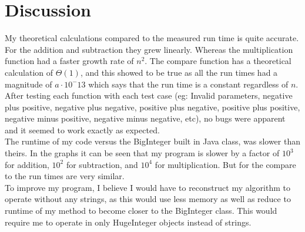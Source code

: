 \documentclass[12pt, letterpaper, titlepage, hidelinks]{article}
\begin{document}
\section{Discussion}
	My theoretical calculations compared to the measured run time is quite accurate. For the addition and subtraction they grew linearly. Whereas the multiplication function had a faster growth rate of $n^2$. The compare function has a theoretical calculation of $\Theta(1)$, and this showed to be true as all the run times had a magnitude of $a\cdot 10^-13$ which says that the run time is a constant regardless of $n$.\\
	After testing each function with each test case (eg: Invalid parameters, negative plus positive, negative plus negative, positive plus negative, positive plus positive, negative minus positive, negative minus negative, etc), no bugs were apparent and it seemed to work exactly as expected.\\
	The runtime of my code versus the BigInteger built in Java class, was slower than theirs. In the graphs it can be seen that my program is slower by a factor of $10^3$ for addition, $10^2$ for subtraction, and $10^4$ for multiplication. But for the compare to the run times are very similar.\\
	To improve my program, I believe I would have to reconstruct my algorithm to operate without any strings, as this would use less memory as well as reduce to runtime of my method to become closer to the BigInteger class. This would require me to operate in only HugeInteger objects instead of strings.
	
\end{document}
